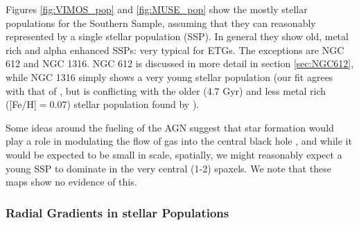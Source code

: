 		Figures \ref{fig:VIMOS_pop} and \ref{fig:MUSE_pop} show the mostly stellar populations for the Southern Sample, assuming that they can reasonably represented by a single stellar population (SSP). In general they show old, metal rich and alpha enhanced SSPs: very typical for ETGs. The exceptions are NGC 612 and NGC 1316. NGC 612 is discussed in more detail in section \ref{sec:NGC612}, while NGC 1316 simply shows a very young stellar population (our fit agrees with that of \citet{Kuntschner2000}, but is conflicting with the older (4.7 Gyr) and less metal rich ([Fe/H]$ = 0.07$) stellar population found by \citet{Koleva2011}). 

		Some ideas around the fueling of the AGN suggest that star formation would play a role in modulating the flow of gas into the central black hole \citep{}, and while it would be expected to be small in scale, spatially, we might reasonably expect a young SSP to dominate in the very central (1-2) spaxels. We note that these maps show no evidence of this. 


		\subsubsection{Radial Gradients in stellar Populations}
			\label{subsubsec:popGrad}

